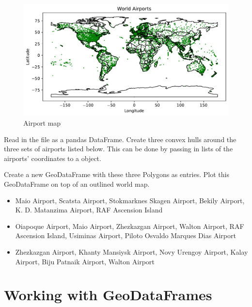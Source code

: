 \begin{figure}[H]
\begin{center}
\includegraphics[scale=.6]{figures/airports.pdf}
\end{center}
\label{airport-map}
\caption{Airport map}
\end{figure}

\begin{problem}
Read in the file  as a pandas DataFrame.
Create three convex hulls around the three sets of airports listed below.
This can be done by passing in lists of the airports' coordinates to a  object.

Create a new GeoDataFrame with these three Polygons as entries.
Plot this GeoDataFrame on top of an outlined world map.
\begin{itemize} %
	\item Maio Airport, Scatsta Airport, Stokmarknes Skagen Airport, Bekily Airport, K. D. Matanzima Airport, RAF Ascension Island
	\item Oiapoque Airport, Maio Airport, Zhezkazgan Airport, Walton Airport, RAF Ascension Island, Usiminas Airport, Piloto Osvaldo Marques Dias Airport
	\item Zhezkazgan Airport, Khanty Mansiysk Airport, Novy Urengoy Airport, Kalay Airport, Biju Patnaik Airport, Walton Airport
\end{itemize}
\end{problem}

\section*{Working with GeoDataFrames} %

